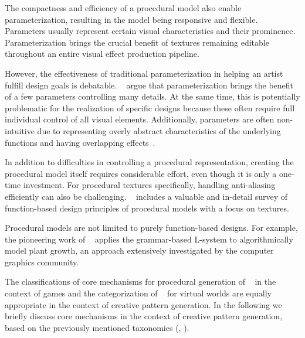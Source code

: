 The compactness and efficiency of a procedural model also enable parameterization, resulting in the model being responsive and flexible. Parameters usually represent certain visual characteristics and their prominence. Parameterization brings the crucial benefit of textures remaining editable throughout an entire visual effect production pipeline.

However, the effectiveness of traditional parameterization in helping an artist fulfill design goals is debatable. \citeauthor*{ebert_2003_tmp}~\cite{ebert_2003_tmp} argue that parameterization brings the benefit of a few parameters controlling many details. At the same time, this is potentially problematic for the realization of specific designs because these often require full individual control of all visual elements. Additionally, parameters are often non-intuitive due to representing overly abstract characteristics of the underlying functions and having overlapping effects~\cite{bourque_2004_ptm,lagae_2010_pis,gilet_2010_ias,benes_2011_gpm,lasram_2012_ssf,lasram_2012_ptp}.

In addition to difficulties in controlling a procedural representation, creating the  procedural model itself requires considerable effort, even though it is only a one-time investment.  For procedural textures specifically, handling anti-aliasing efficiently can also be challenging. \citeauthor*{ebert_2003_tmp}~\cite{ebert_2003_tmp} includes a valuable and in-detail survey of function-based design principles of procedural models with a focus on textures. 

Procedural models are not limited to purely function-based designs. For example, the pioneering work of \citeauthor*{Prusinkiewicz_2012_TAB}~\cite{Prusinkiewicz_2012_TAB} applies the grammar-based L-system to algorithmically model plant growth, an approach extensively investigated by the computer graphics community.

The classifications of core mechanisms for procedural generation of \citeauthor*{hendrikx_2013_pcg}~\cite{hendrikx_2013_pcg} in the context of games and the categorization of \citeauthor*{smelik_2014_aso}~\cite{smelik_2014_aso} for virtual worlds are equally appropriate in the context of creative pattern generation. In the following we briefly discuss core mechanisms in the context of creative pattern generation, based on the previously mentioned taxonomies (\cite{hendrikx_2013_pcg}, \cite{smelik_2014_aso}).

